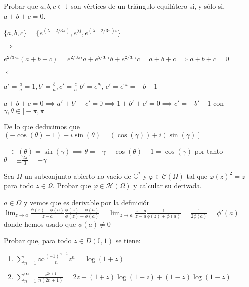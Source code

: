 \begin{ejer}
	Probar que $a, b, c \in\mathbb{T}$ son vértices de un triángulo equilátero si, y sólo si, $a+b+c = 0$.
\end{ejer}

\begin{sol}

$\{ a,b,c \} = \{ e^(\lambda - 2/3\pi), e^{\lambda i}, e^{(\lambda + 2/3\pi)i} \}$

$\Rightarrow$

$e^{2/3\pi i} (a+b+c) = e^{2/3\pi i} a + e^{2/3\pi i}b + e^{2/3\pi i}c = a+b+c \implies a+b+c=0$

$\Leftarrow$

$a'=\frac{a}{a} = 1, b'=\frac{b}{a}, c'=\frac{c}{a}$
$b'=e^{\theta i}$, $c' = e^{\gamma i} = -b-1$


$a+b+c = 0 \implies a'+b'+c' = 0 \implies 1+b'+c' = 0 \implies c'=-b'-1$ con $\gamma,\theta\in ]-\pi,\pi[$

De lo que deducimos que 
$(-\cos(\theta)-1)-i\sin(\theta) = (\cos(\gamma)) + i(\sin(\gamma))$

$-\in(\theta) = \sin(\gamma) \implies \theta = -\gamma $
$-\cos(\theta) -1 =  \cos(\gamma)$
por tanto
$\theta = \pm\frac{2\pi}{3} = -\gamma$

\end{sol}




\begin{ejer}
	Sea $\Omega$ un subconjunto abierto no vacío de $\mathbb{C}^{\ast}$ y $\varphi\in\mathcal{C}(\Omega)$ tal que $\varphi(z)^2 = z$ para todo $z\in\Omega$. Probar que $\varphi\in\mathcal{H}(\Omega)$ y calcular su derivada.
\end{ejer}

\begin{sol}
$a\in\Omega$ y vemos que es derivable por la definición
$\lim_{z\rightarrow a} \frac{\phi(z)-\phi(a)}{z-a} \frac{\phi(z)-\phi(a)}{\phi(z)+\phi(a)} = \lim_{z\rightarrow a} \frac{z-a}{z-a} \frac{1}{\phi(z)+\phi(a)} = \frac{1}{2\phi(a)} = \phi '(a)$
donde hemos usado que $\phi(a)\not = 0$

\end{sol}



\begin{ejer}
	Probar que, para todo $z \in D(0, 1)$ se tiene:
	\begin{enumerate}[label=(\alph*)]
		\item $\sum_{n=1}{\infty} \frac{(-1)^{n+1}}{n} z^n = \log(1+z)$
		\item $\sum_{n=1}^{\infty} \frac{z^{2n+1}}{n(2n+1)} = 2z-(1+z)\log(1+z)+(1-z)\log(1-z)$
	\end{enumerate}
\end{ejer}

